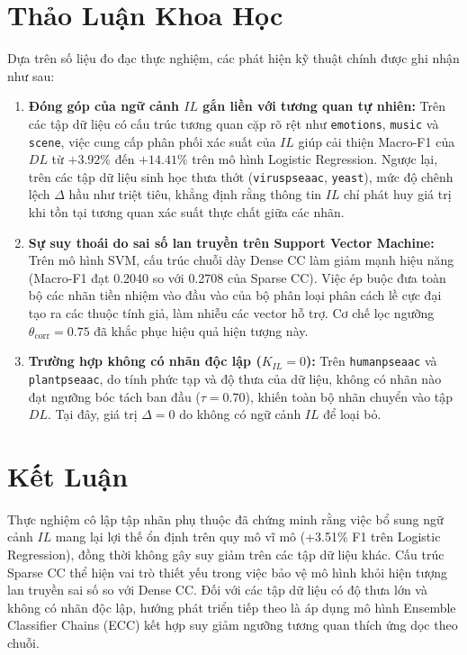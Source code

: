 \documentclass[11pt,a4paper]{article}
\begin{document}
\section{Thảo Luận Khoa Học}
Dựa trên số liệu đo đạc thực nghiệm, các phát hiện kỹ thuật chính được ghi nhận như sau:
\begin{enumerate}[leftmargin=*]
  \item \textbf{Đóng góp của ngữ cảnh $IL$ gắn liền với tương quan tự nhiên:} Trên các tập dữ liệu có cấu trúc tương quan cặp rõ rệt như \texttt{emotions}, \texttt{music} và \texttt{scene}, việc cung cấp phân phối xác suất của $IL$ giúp cải thiện Macro-F1 của $DL$ từ $+3.92\%$ đến $+14.41\%$ trên mô hình Logistic Regression. Ngược lại, trên các tập dữ liệu sinh học thưa thớt (\texttt{viruspseaac}, \texttt{yeast}), mức độ chênh lệch $\Delta$ hầu như triệt tiêu, khẳng định rằng thông tin $IL$ chỉ phát huy giá trị khi tồn tại tương quan xác suất thực chất giữa các nhãn.
  \item \textbf{Sự suy thoái do sai số lan truyền trên Support Vector Machine:} Trên mô hình SVM, cấu trúc chuỗi dày Dense CC làm giảm mạnh hiệu năng (Macro-F1 đạt 0.2040 so với 0.2708 của Sparse CC). Việc ép buộc đưa toàn bộ các nhãn tiền nhiệm vào đầu vào của bộ phân loại phân cách lề cực đại tạo ra các thuộc tính giả, làm nhiễu các vector hỗ trợ. Cơ chế lọc ngưỡng $\theta_{\text{corr}} = 0.75$ đã khắc phục hiệu quả hiện tượng này.
  \item \textbf{Trường hợp không có nhãn độc lập ($K_{IL} = 0$):} Trên \texttt{humanpseaac} và \texttt{plantpseaac}, do tính phức tạp và độ thưa của dữ liệu, không có nhãn nào đạt ngưỡng bóc tách ban đầu ($\tau = 0.70$), khiến toàn bộ nhãn chuyển vào tập $DL$. Tại đây, giá trị $\Delta = 0$ do không có ngữ cảnh $IL$ để loại bỏ.
\end{enumerate}

\section{Kết Luận}
Thực nghiệm cô lập tập nhãn phụ thuộc đã chứng minh rằng việc bổ sung ngữ cảnh $IL$ mang lại lợi thế ổn định trên quy mô vĩ mô (+3.51\% F1 trên Logistic Regression), đồng thời không gây suy giảm trên các tập dữ liệu khác. Cấu trúc Sparse CC thể hiện vai trò thiết yếu trong việc bảo vệ mô hình khỏi hiện tượng lan truyền sai số so với Dense CC. Đối với các tập dữ liệu có độ thưa lớn và không có nhãn độc lập, hướng phát triển tiếp theo là áp dụng mô hình Ensemble Classifier Chains (ECC) kết hợp suy giảm ngưỡng tương quan thích ứng dọc theo chuỗi.
\end{document}
